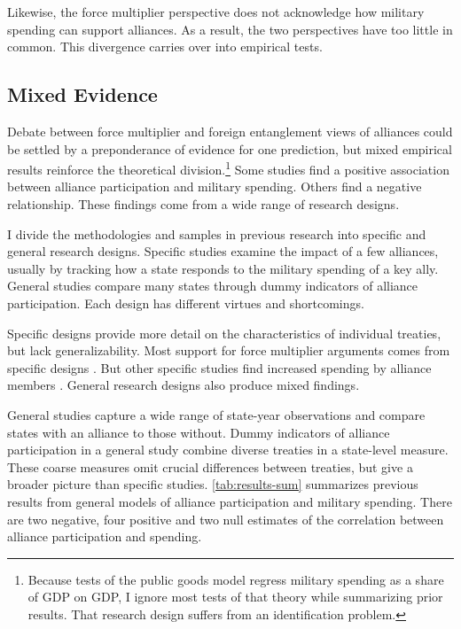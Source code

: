 \documentclass[12pt]{article}
\begin{document}
 
Likewise, the force multiplier perspective does not acknowledge how military spending can support alliances. 
As a result, the two perspectives have too little in common. 
This divergence carries over into empirical tests. 


\subsection{Mixed Evidence} 


Debate between force multiplier and foreign entanglement views of alliances could be settled by a preponderance of evidence for one prediction, but mixed empirical results reinforce the theoretical division.\footnote{
Because tests of the public goods model regress military spending as a share of GDP on GDP, I ignore most tests of that theory while summarizing prior results. That research design suffers from an identification problem.}
Some studies find a positive association between alliance participation and military spending. 
Others find a negative relationship. 
These findings come from a wide range of research designs. 


I divide the methodologies and samples in previous research into specific and general research designs.  
Specific studies examine the impact of a few alliances, usually by tracking how a state responds to the military spending of a key ally. 
General studies compare many states through dummy indicators of alliance participation. 
Each design has different virtues and shortcomings. 


Specific designs provide more detail on the characteristics of individual treaties, but lack generalizability. 
Most support for force multiplier arguments comes from specific designs \citep{BarnettLevy1991, Morrow1993, Sorokin1994, PluemperNeumayer2015}. 
But other specific studies find increased spending by alliance members \citep{ConybeareSandler1990, Chenetal1996}. 
General research designs also produce mixed findings. 


General studies capture a wide range of state-year observations and compare states with an alliance to those without.
Dummy indicators of alliance participation in a general study combine diverse treaties in a state-level measure. 
These coarse measures omit crucial differences between treaties, but give a broader picture than specific studies. 
\autoref{tab:results-sum} summarizes previous results from general models of alliance participation and military spending. 
There are two negative, four positive and two null estimates of the correlation between alliance participation and spending. 
\end{document}
